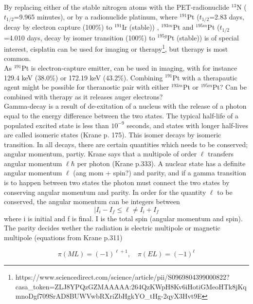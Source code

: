 \documentclass[a4paper,11pt,twoside]{book}
\begin{document}
By replacing either of the stable nitrogen atoms with the PET-radionuclide $^{13}$N ($t_{1/2}$=9.965 minutes), or by a radionuclide platinum, where $^{191}$Pt ($t_{1/2}$=2.83 days, decay by electron capture (100\%) to $^{191}$Ir (stable)) , $^{193m}$Pt and $^{195m}$Pt ($t_{1/2}$=4.010 days, decay by isomer transition (100\%) to $^{195g}$Pt (stable)) is of special interest, cisplatin can be used for imaging or therapy\footnote{https://www.sciencedirect.com/science/article/pii/S0969804399000822?casa_token=ZLJ8YPQzGZMAAAAA:264QzKWpH8Kv6iHotiGMeoHTk8jKqmnoDgf709SrAD8BUWVwbRXriZbHgkYO_tHg-2qyX3Hvt9E}, but therapy is most common. \\ 

\noindent 
As $^{191}$Pt is electron-capture emitter, can be used in imaging, with for instance 129.4 keV (38.0\%) or 172.19 keV (43.2\%). Combining $^{191}$Pt with a therapautic agent might be possible for theranostic pair with either $^{193m}$Pt or $^{195m}$Pt? Can be combined with therapy as it releases auger electrons? \\

Gamma-decay is a result of de-exitation of a nucleus with the release of a photon equal to the energy difference between the two states. The typical half-life of a populated excited state is less than $10^{-9}$ seconds, and states with longer half-lives are called isomeric states (Krane p. 175). This isomer decays by isomeric transition. In all decays, there are certain quantities which needs to be conserved; angular momentum, partiy. Krane says that a multipole of order $\ell$ transfers angular momentum $\ell \hbar$ per photon (Krane p.333). A nuclear state has a definite angular momentum $\ell$ (ang mom + spin?) and parity, and if a gamma transition is to happen between two states the photon must connect the two states by conserving angular momentum and parity. In order for the quantity $\ell$ to be conserved, the angular momentum can be integers between 
\begin{equation}
    |I_i - I_f \leq \ell \neq I_i + I_f
\end{equation}
where i is initial and f is final. I is the total spin (angular momentum and spin). The parity decides wether  the radiation is electric multipole or magnetic multipole (equations from Krane p.311)

\begin{equation}
\pi (ML)= (-1)^{\ell+1}, \quad \pi(EL) = (-1)^\ell    
\end{equation}
\end{document}
